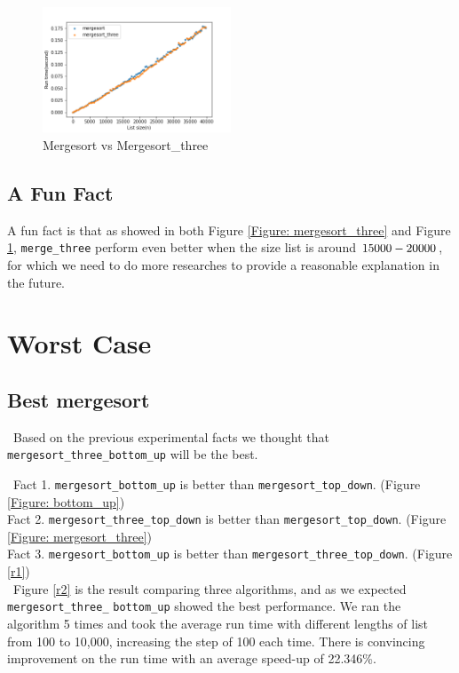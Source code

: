 \documentclass[12pt]{article}
\begin{document}
\begin{figure}[h!]
\centering
\includegraphics[width=0.5\textwidth,height=\textheight,keepaspectratio]{Figures/traditional_mergesort_vs_mergesort_three.png}
\caption{Mergesort vs Mergesort\_three}
\label{Figure: traditional_mergesort}
\end{figure}

\subsection{A Fun Fact}
A fun fact is that as showed in both Figure \ref{Figure: mergesort_three} and Figure \ref{Figure: traditional_mergesort}, \verb|merge_three| perform even better when the size list is around $15000 \-- 20000$, for which we need to do more researches to provide a reasonable explanation in the future.


\section{Worst Case}
\subsection{Best mergesort}
~\newline\noindent Based on the previous experimental facts we thought that 
\verb|mergesort_three_bottom_up| will be the best.

~\newline\noindent Fact 1. \verb|mergesort_bottom_up| is better than
 \verb|mergesort_top_down|. (Figure \ref{Figure: bottom_up}) \\
Fact 2. \verb|mergesort_three_top_down| is better than
 \verb|mergesort_top_down|. (Figure \ref{Figure: mergesort_three}) \\
Fact 3. \verb|mergesort_bottom_up| is better than
 \verb|mergesort_three_top_down|. (Figure \ref{r1})\\

 ~\newline\noindent Figure \ref{r2} is the result comparing three algorithms, 
 and as we expected \verb|mergesort_three_|
 \verb|bottom_up| showed the best performance.
  We ran the algorithm 5 times and took the average run time with different 
lengths of list from 100 to 10,000, increasing the step of 100 each time.
There is convincing improvement on the run time with an average 
speed-up of 22.346\%. 
\end{document}
